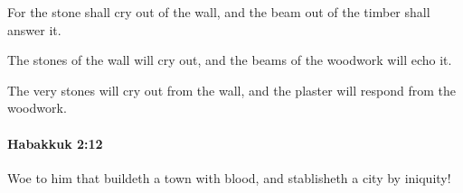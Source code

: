 			\begin{versebox}
					\item[BHS] 
					\item[LXX] 
					\item[ASV] For the stone shall cry out of the wall, and the beam out of the timber shall answer it.
					\item[NIV] The stones of the wall will cry out, and the beams of the woodwork will echo it.
					\item[NRSV] The very stones will cry out from the wall, and the plaster will respond from the woodwork.
			\end{versebox}

		\paragraph{Habakkuk 2:12} %
			\label{HABAKKUK-2-12}

			Woe to him that buildeth a town with blood, and stablisheth a city by iniquity!

